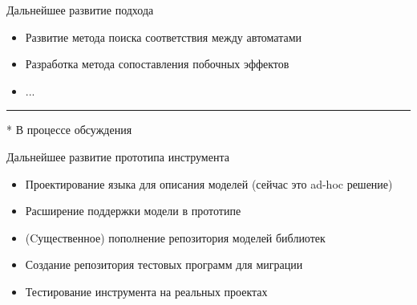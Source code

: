\documentclass[12pt]{beamer}
\begin{document}
{
\begin{frame}{Дальнейшее развитие подхода}
	\begin{mybox}[]
	\begin{itemize}	
		\item Развитие метода поиска соответствия между автоматами
		\item Разработка метода сопоставления побочных эффектов
		\item ...
	\end{itemize}
	
	  \noindent\rule{4cm}{0.4pt}
	  
	  \begingroup
	  \tiny
	    	* В процессе обсуждения
	  \endgroup
	\end{mybox}
\end{frame}
}

{
\begin{frame}{Дальнейшее развитие прототипа инструмента}
	\begin{mybox}[]
	\begin{itemize}
		\item Проектирование языка для описания моделей (сейчас это ad-hoc решение)
		\item Расширение поддержки модели в прототипе
		\item (Cущественное) пополнение репозитория моделей библиотек
		\item Создание репозитория тестовых программ для миграции
		\item Тестирование инструмента на реальных проектах
	\end{itemize}
	\end{mybox}
\end{frame}
}
\end{document}

